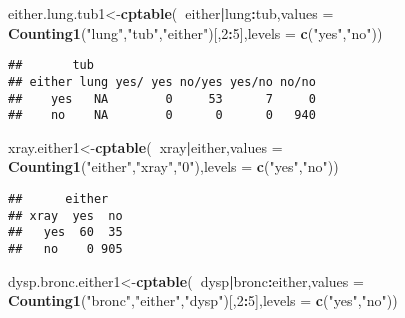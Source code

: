 \documentclass[
]{article}
\newenvironment{Shaded}{\begin{snugshade}}{\end{snugshade}}
\newcommand{\DataTypeTok}[1]{\textcolor[rgb]{0.13,0.29,0.53}{#1}}
\newcommand{\DecValTok}[1]{\textcolor[rgb]{0.00,0.00,0.81}{#1}}
\newcommand{\KeywordTok}[1]{\textcolor[rgb]{0.13,0.29,0.53}{\textbf{#1}}}
\newcommand{\NormalTok}[1]{#1}
\newcommand{\OperatorTok}[1]{\textcolor[rgb]{0.81,0.36,0.00}{\textbf{#1}}}
\newcommand{\StringTok}[1]{\textcolor[rgb]{0.31,0.60,0.02}{#1}}
\begin{document}
\begin{Shaded}
\begin{Highlighting}[]
\NormalTok{either.lung.tub1<-}\KeywordTok{cptable}\NormalTok{(}\OperatorTok{~}\NormalTok{either}\OperatorTok{|}\NormalTok{lung}\OperatorTok{:}\NormalTok{tub,}\DataTypeTok{values =} \KeywordTok{Counting1}\NormalTok{(}\StringTok{"lung"}\NormalTok{,}\StringTok{"tub"}\NormalTok{,}\StringTok{"either"}\NormalTok{)[,}\DecValTok{2}\OperatorTok{:}\DecValTok{5}\NormalTok{],}\DataTypeTok{levels =} \KeywordTok{c}\NormalTok{(}\StringTok{"yes"}\NormalTok{,}\StringTok{"no"}\NormalTok{)) }
\end{Highlighting}
\end{Shaded}

\begin{verbatim}
##       tub
## either lung yes/ yes no/yes yes/no no/no
##    yes   NA        0     53      7     0
##    no    NA        0      0      0   940
\end{verbatim}

\begin{Shaded}
\begin{Highlighting}[]
\NormalTok{xray.either1<-}\KeywordTok{cptable}\NormalTok{(}\OperatorTok{~}\NormalTok{xray}\OperatorTok{|}\NormalTok{either,}\DataTypeTok{values =} \KeywordTok{Counting1}\NormalTok{(}\StringTok{"either"}\NormalTok{,}\StringTok{"xray"}\NormalTok{,}\StringTok{"0"}\NormalTok{),}\DataTypeTok{levels =} \KeywordTok{c}\NormalTok{(}\StringTok{"yes"}\NormalTok{,}\StringTok{"no"}\NormalTok{))}
\end{Highlighting}
\end{Shaded}

\begin{verbatim}
##      either
## xray  yes  no
##   yes  60  35
##   no    0 905
\end{verbatim}

\begin{Shaded}
\begin{Highlighting}[]
\NormalTok{dysp.bronc.either1<-}\KeywordTok{cptable}\NormalTok{(}\OperatorTok{~}\NormalTok{dysp}\OperatorTok{|}\NormalTok{bronc}\OperatorTok{:}\NormalTok{either,}\DataTypeTok{values =} \KeywordTok{Counting1}\NormalTok{(}\StringTok{"bronc"}\NormalTok{,}\StringTok{"either"}\NormalTok{,}\StringTok{"dysp"}\NormalTok{)[,}\DecValTok{2}\OperatorTok{:}\DecValTok{5}\NormalTok{],}\DataTypeTok{levels =} \KeywordTok{c}\NormalTok{(}\StringTok{"yes"}\NormalTok{,}\StringTok{"no"}\NormalTok{))}
\end{Highlighting}
\end{Shaded}
\end{document}

